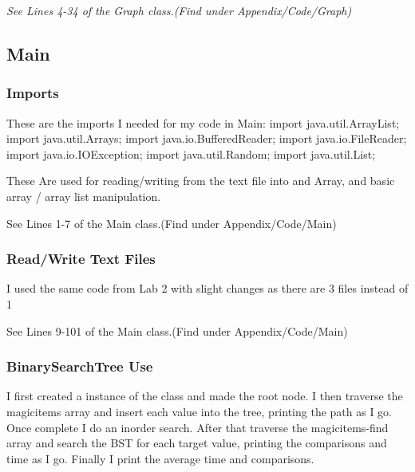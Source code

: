 \documentclass[10pt]{article}
\begin{document}
\newline

\emph{\normalfont
See Lines 4-34 of the Graph class.(Find under Appendix/Code/Graph)}

\subsection{Main}\label{operations}

\subsubsection{Imports}

These are the imports I needed for my code in Main:
\newline
import java.util.ArrayList;
\newline
import java.util.Arrays;
\newline
import java.io.BufferedReader;
\newline
import java.io.FileReader;
\newline
import java.io.IOException;
\newline
import java.util.Random;
\newline
import java.util.List;


These Are used for reading/writing from the text file into and Array, and basic array / array list manipulation.

See Lines 1-7 of the Main class.(Find under Appendix/Code/Main)

\subsubsection{Read/Write Text Files}
I used the same code from Lab 2 with slight changes as there are 3 files instead of 1

See Lines 9-101 of the Main class.(Find under Appendix/Code/Main)

\subsubsection{BinarySearchTree Use}
I first created a instance of the class and made the root node. I then traverse the magicitems array and insert each value into the tree, printing the path as I go. Once complete I do an inorder search. After that traverse the magicitems-find array and search the BST for each target value, printing the comparisons and time as I go. Finally I print the average time and comparisons.
\end{document}
